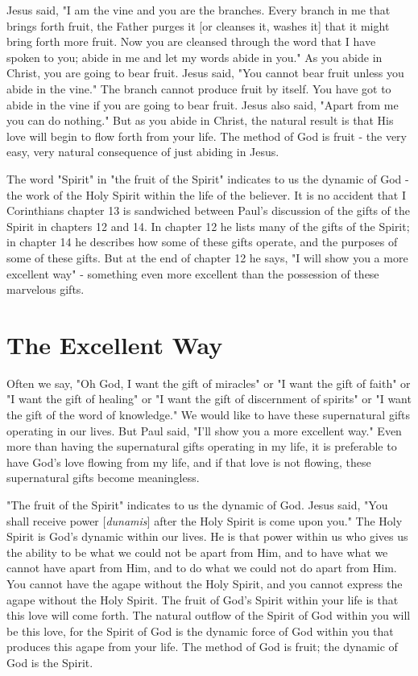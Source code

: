 Jesus said, "I am the vine and you are the branches. Every branch in me that brings forth fruit, the Father purges it [or cleanses it, washes it] that it might bring forth more fruit. Now you are cleansed through the word that I have spoken to you; abide in me and let my words abide in you." As you abide in Christ, you are going to bear fruit. Jesus said, "You cannot bear fruit unless you abide in the vine." The branch cannot produce fruit by itself. You have got to abide in the vine if you are going to bear fruit. Jesus also said, "Apart from me you can do nothing." But as you abide in Christ, the natural result is that His love will begin to flow forth from your life. The method of God is fruit - the very easy, very natural consequence of just abiding in Jesus. 

The word "Spirit" in "the fruit of the Spirit" indicates to us the dynamic of God - the work of the Holy Spirit within the life of the believer. It is no accident that I Corinthians chapter 13 is sandwiched between Paul's discussion of the gifts of the Spirit in chapters 12 and 14. In chapter 12 he lists many of the gifts of the Spirit; in chapter 14 he describes how some of these gifts operate, and the purposes of some of these gifts. But at the end of chapter 12 he says, "I will show you a more excellent way" - something even more excellent than the possession of these marvelous gifts. 

\section*{The Excellent Way}

Often we say, "Oh God, I want the gift of miracles" or "I want the gift of faith" or "I want the gift of healing" or "I want the gift of discernment of spirits" or "I want the gift of the word of knowledge." We would like to have these supernatural gifts operating in our lives. But Paul said, "I'll show you a more excellent way." Even more than having the supernatural gifts operating in my life, it is preferable to have God's love flowing from my life, and if that love is not flowing, these supernatural gifts become meaningless. 

"The fruit of the Spirit" indicates to us the dynamic of God. Jesus said, "You shall receive power [\emph{dunamis}] after the Holy Spirit is come upon you." The Holy Spirit is God's dynamic within our lives. He is that power within us who gives us the ability to be what we could not be apart from Him, and to have what we cannot have apart from Him, and to do what we could not do apart from Him. You cannot have the agape without the Holy Spirit, and you cannot express the agape without the Holy Spirit. The fruit of God's Spirit within your life is that this love will come forth. The natural outflow of the Spirit of God within you will be this love, for the Spirit of God is the dynamic force of God within you that produces this agape from your life. The method of God is fruit; the dynamic of God is the Spirit. 

